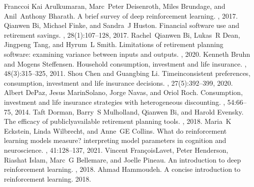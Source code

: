 \documentclass[letterpaper,10pt,english]{jupyterBook}
\begin{document}
\begin{sphinxthebibliography}{Franccoi}
\sphinxAtStartPar
Kai Arulkumaran, Marc Peter Deisenroth, Miles Brundage, and Anil Anthony Bharath. A brief survey of deep reinforcement learning. , 2017.
\sphinxAtStartPar
Qianwen Bi, Michael Finke, and Sandra J Huston. Financial software use and retirement savings. , 28(1):107–128, 2017.
\sphinxAtStartPar
Rachel Qianwen Bi, Lukas R Dean, Jingpeng Tang, and Hyrum L Smith. Limitations of retirement planning software: examining variance between inputs and outputs. , 2020.
\sphinxAtStartPar
Kenneth Bruhn and Mogens Steffensen. Household consumption, investment and life insurance. , 48(3):315–325, 2011.
\sphinxAtStartPar
Shou Chen and Guangbing Li. Time\sphinxhyphen{}inconsistent preferences, consumption, investment and life insurance decisions. , 27(5):392–399, 2020.
\sphinxAtStartPar
Albert De\sphinxhyphen{}Paz, Jesus Marin\sphinxhyphen{}Solano, Jorge Navas, and Oriol Roch. Consumption, investment and life insurance strategies with heterogeneous discounting. , 54:66–75, 2014.
\sphinxAtStartPar
Taft Dorman, Barry S Mulholland, Qianwen Bi, and Harold Evensky. The efficacy of publicly\sphinxhyphen{}available retirement planning tools. , 2018.
\sphinxAtStartPar
Maria K Eckstein, Linda Wilbrecht, and Anne GE Collins. What do reinforcement learning models measure? interpreting model parameters in cognition and neuroscience. , 41:128–137, 2021.
\sphinxAtStartPar
Vincent François\sphinxhyphen{}Lavet, Peter Henderson, Riashat Islam, Marc G Bellemare, and Joelle Pineau. An introduction to deep reinforcement learning. , 2018.
\sphinxAtStartPar
Ahmad Hammoudeh. A concise introduction to reinforcement learning. 2018.

\end{sphinxthebibliography}
\end{document}
